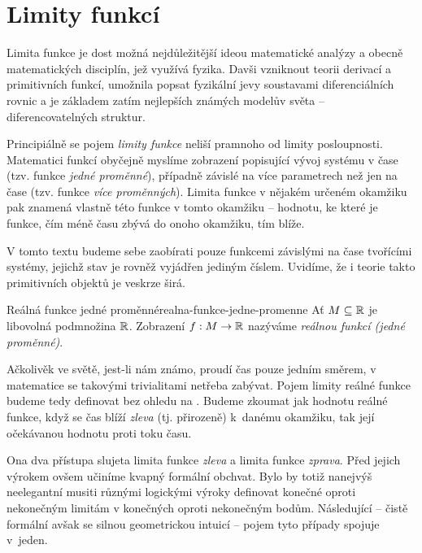 \chapter{Limity funkcí}
\label{chap:limity-funkci}

Limita funkce je dost možná nejdůležitější ideou matematické analýzy a obecně
matematických disciplín, jež využívá fyzika. Davši vzniknout teorii derivací a
primitivních funkcí, umožnila popsat fyzikální jevy soustavami diferenciálních
rovnic a je základem zatím nejlepších známých modelův světa --
diferencovatelných struktur.

Principiálně se pojem \emph{limity funkce} neliší pramnoho od limity
posloupnosti. Matematici funkcí obyčejně myslíme zobrazení popisující vývoj
systému v čase (tzv. funkce \emph{jedné proměnné}), případně závislé na více
parametrech než jen na čase (tzv. funkce \emph{více proměnných}). Limita funkce
v nějakém určeném okamžiku pak znamená vlastně  této
funkce v tomto okamžiku -- hodnotu, ke které je funkce, čím méně času zbývá do
onoho okamžiku, tím blíže.

V tomto textu budeme sebe zaobírati pouze funkcemi závislými na čase tvořícími
systémy, jejichž stav je rovněž vyjádřen jediným číslem. Uvidíme, že i teorie
takto primitivních objektů je veskrze širá.

\begin{definition}{Reálná funkce jedné proměnné}{realna-funkce-jedne-promenne}
 Ať $M \subseteq \mathbb{R}$ je libovolná podmnožina $\mathbb{R}$. Zobrazení $f:M \to \mathbb{R}$
 nazýváme \emph{reálnou funkcí (jedné proměnné)}.
\end{definition}

Ačkolivěk ve světě, jest-li nám známo, proudí čas pouze jedním směrem, v
matematice se takovými trivialitami netřeba zabývat. Pojem limity reálné funkce
budeme tedy definovat bez ohledu na . Budeme zkoumat jak hodnotu
reálné funkce, když se čas blíží \emph{zleva} (tj. přirozeně) k~danému okamžiku,
tak její očekávanou hodnotu proti toku času.

Ona dva přístupa slujeta limita funkce \emph{zleva} a limita funkce
\emph{zprava}. Před jejich výrokem ovšem učiníme kvapný formální obchvat. Bylo
by totiž nanejvýš neelegantní musiti různými logickými výroky definovat konečné
oproti nekonečným limitám v konečných oproti nekonečným bodům. Následující --
čistě formální avšak se silnou geometrickou intuicí -- pojem tyto případy
spojuje v~jeden.

